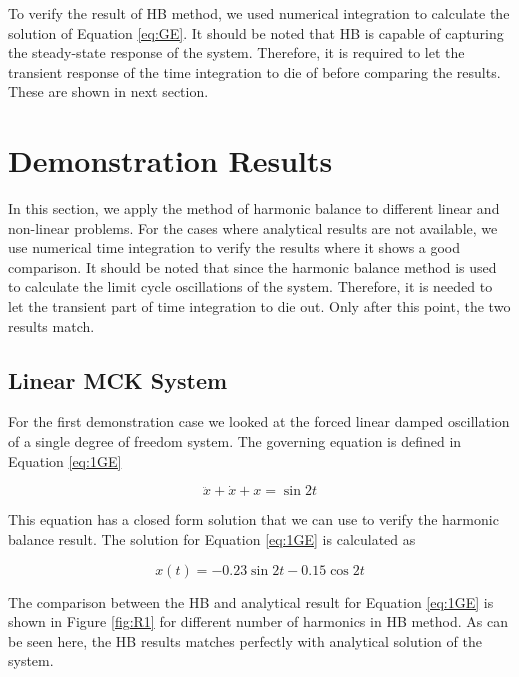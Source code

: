 \documentclass[12pt, a4paper]{extarticle}
\begin{document}
To verify the result of HB method, we used numerical integration to calculate the solution of Equation \eqref{eq:GE}. It should be noted that HB is capable of capturing the steady-state response of the system. Therefore, it is required to let the transient response of the time integration to die of before comparing the results. These are shown in next section.

\section{Demonstration Results}
In this section, we apply the method of harmonic balance to different linear and non-linear problems. For the cases where analytical results are not available, we use numerical time integration to verify the results where it shows a good comparison. It should be noted that since the harmonic balance method is used to calculate the limit cycle oscillations of the system. Therefore, it is needed to let the transient part of time integration to die out. Only after this point, the two results match.

\subsection{Linear MCK System}
For the first demonstration case we looked at the forced linear damped oscillation of a single degree of freedom system. The governing equation is defined in Equation \eqref{eq:1GE}

\begin{equation}\label{eq:1GE}
	\ddot{x} + \dot{x} + x = \sin 2t
\end{equation}

This equation has a closed form solution that we can use to verify the harmonic balance result. The solution for Equation \eqref{eq:1GE} is calculated as

\begin{equation}
	x(t) = -0.23 \sin 2t - 0.15 \cos 2t
\end{equation}

The comparison between the HB and analytical result for Equation \eqref{eq:1GE} is shown in Figure \ref{fig:R1} for different number of harmonics in HB method. As can be seen here, the HB results matches perfectly with analytical solution of the system.
\end{document}
